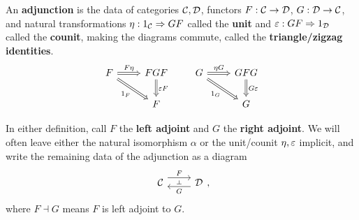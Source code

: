 \documentclass[12pt]{article}
\begin{document}
\begin{defn}
    An \textbf{adjunction} is the data of categories $\mathcal{C},\mathcal{D}$, functors $F:\mathcal{C}\to\mathcal{D}$, $G:\mathcal{D}\to \mathcal{C}$, and natural transformations $\eta: 1_{\mathcal{C}} \Rightarrow GF$ called the \textbf{unit} and $\varepsilon: GF\Rightarrow 1_{\mathcal{D}}$ called the \textbf{counit}, making the diagrams commute, called the \textbf{triangle/zigzag identities}.
    \begin{equation}
    \begin{tikzcd}
        F \rar[Rightarrow,"F\eta"] \ar[dr,Rightarrow,"1_F"'] & FGF \dar[Rightarrow,"\eps F"]\\
        & F
    \end{tikzcd}\qquad \begin{tikzcd}
        G \rar[Rightarrow,"\eta G"] \ar[dr,Rightarrow,"1_G"'] & GFG \dar[Rightarrow,"G \eps"]\\
        & G
    \end{tikzcd} \label{counit and unit relations}
    \end{equation}
\end{defn}

In either definition, call $F$ the \textbf{left adjoint} and $G$ the \textbf{right adjoint}. We will often leave either the natural isomorphism $\alpha$ or the unit/counit $\eta,\varepsilon$ implicit, and write the remaining data of the adjunction as a diagram
\[\adjunction{\cC}{\cD}{F}{G},\]
where $F \dashv G$ means $F$ is left adjoint to $G$.
\end{document}
